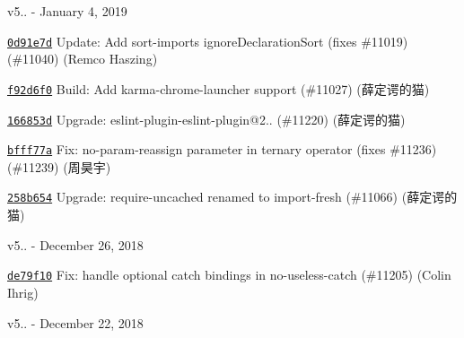 v5.. -\/ January 4, 2019


\begin{DoxyItemize}
\item \href{https://github.com/eslint/eslint/commit/0d91e7d28e5eba79a6032165cdef5d4549d26462}{\texttt{ {\ttfamily 0d91e7d}}} Update\+: Add sort-\/imports ignore\+Declaration\+Sort (fixes \#11019) (\#11040) (Remco Haszing)
\item \href{https://github.com/eslint/eslint/commit/f92d6f05c4dcd4a3a0616871e10b31edae9dfad5}{\texttt{ {\ttfamily f92d6f0}}} Build\+: Add karma-\/chrome-\/launcher support (\#11027) (薛定谔的猫)
\item \href{https://github.com/eslint/eslint/commit/166853d9c59db493f0b1bb68a67ad868662a4205}{\texttt{ {\ttfamily 166853d}}} Upgrade\+: eslint-\/plugin-\/eslint-\/plugin@2.. (\#11220) (薛定谔的猫)
\item \href{https://github.com/eslint/eslint/commit/bfff77ad4eaa02e2e62481c986634df38d5db6e5}{\texttt{ {\ttfamily bfff77a}}} Fix\+: no-\/param-\/reassign parameter in ternary operator (fixes \#11236) (\#11239) (周昊宇)
\item \href{https://github.com/eslint/eslint/commit/258b6541f61dc3a9ae64e200680766a11c3dd316}{\texttt{ {\ttfamily 258b654}}} Upgrade\+: require-\/uncached renamed to import-\/fresh (\#11066) (薛定谔的猫)
\end{DoxyItemize}

v5.. -\/ December 26, 2018


\begin{DoxyItemize}
\item \href{https://github.com/eslint/eslint/commit/de79f1026b7035f0296d7876f1db64f225cca1b8}{\texttt{ {\ttfamily de79f10}}} Fix\+: handle optional catch bindings in no-\/useless-\/catch (\#11205) (Colin Ihrig)
\end{DoxyItemize}

v5.. -\/ December 22, 2018


